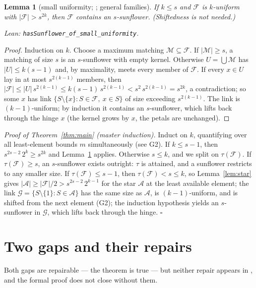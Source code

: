 \documentclass[11pt,a4paper]{article}
\newtheorem{lemma}{Lemma}
\theoremstyle{remark}
\newcommand{\cA}{\mathcal{A}}
\newcommand{\cF}{\mathcal{F}}
\newcommand{\cG}{\mathcal{G}}
\newcommand{\cM}{\mathcal{M}}
\begin{document}
\begin{lemma}[small uniformity; {\cite[Theorem~1, first branch]{Mi26}};
general families]\label{lem:smallk}
If $k\le s$ and $\cF$ is $k$-uniform with $|\cF|>s^{2k}$, then $\cF$
contains an $s$-sunflower. (Shiftedness is not needed.)

\noindent\emph{Lean:} \texttt{hasSunflower\_of\_small\_uniformity}.
\end{lemma}

\begin{proof}
Induction on $k$. Choose a maximum matching $\cM\subseteq\cF$. If
$|\cM|\ge s$, a matching of size $s$ is an $s$-sunflower with empty
kernel. Otherwise $U=\bigcup\cM$ has $|U|\le k(s-1)$ and, by
maximality, meets every member of $\cF$. If every $x\in U$ lay in at
most $s^{2(k-1)}$ members, then
$|\cF|\le|U|\,s^{2(k-1)}\le k(s-1)\,s^{2(k-1)}<s^{2}\,s^{2(k-1)}
=s^{2k}$, a contradiction; so some $x$ has link
$\{S\setminus\{x\}:S\in\cF,\ x\in S\}$ of size exceeding $s^{2(k-1)}$.
The link is $(k-1)$-uniform; by induction it contains an
$s$-sunflower, which lifts back through the hinge $x$ (the kernel
grows by $x$, the petals are unchanged).
\end{proof}

\emph{Proof of Theorem~\ref{thm:main} (master induction).} Induct on
$k$, quantifying over all least-element bounds $m$ simultaneously (see
G2). If $k\le s-1$, then $s^{2s-2}\,2^{k}\ge s^{2k}$ and
Lemma~\ref{lem:smallk} applies. Otherwise $s\le k$, and we split on
$\tau(\cF)$. If $\tau(\cF)\ge s$, an $s$-sunflower exists outright:
$\tau$ is attained, and a sunflower restricts to any smaller size. If
$\tau(\cF)\le s-1$, then $\tau(\cF)<s\le k$, so
Lemma~\ref{lem:star} gives
$|\cA|\ge|\cF|/2>s^{2s-2}\,2^{k-1}$ for the star $\cA$ at the least
available element; the link
$\cG=\{S\setminus\{1\}:S\in\cA\}$ has the same size as $\cA$, is
$(k-1)$-uniform, and is shifted from the next element (G2); the
induction hypothesis yields an $s$-sunflower in $\cG$, which lifts back
through the hinge. \hfill$\square$

\section{Two gaps and their repairs}\label{sec:gaps}

Both gaps are repairable --- the theorem is true --- but neither repair
appears in \cite{Mi26}, and the formal proof does not close without
them.
\end{document}
